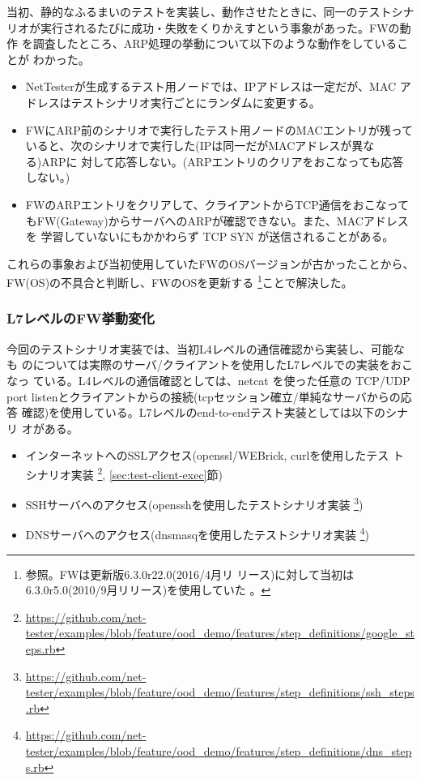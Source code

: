 当初、静的なふるまいのテストを実装し、動作させたときに、同一のテストシナ
リオが実行されるたびに成功・失敗をくりかえすという事象があった。FWの動作
を調査したところ、ARP処理の挙動について以下のような動作をしていることが
わかった。
\begin{itemize}
 \item NetTesterが生成するテスト用ノードでは、IPアドレスは一定だが、MAC
       アドレスはテストシナリオ実行ごとにランダムに変更する。
 \item FWにARP前のシナリオで実行したテスト用ノードのMACエントリが残って
       いると、次のシナリオで実行した(IPは同一だがMACアドレスが異なる)ARPに
       対して応答しない。(ARPエントリのクリアをおこなっても応答しない。)
 \item FWのARPエントリをクリアして、クライアントからTCP通信をおこなって
       もFW(Gateway)からサーバへのARPが確認できない。また、MACアドレスを
       学習していないにもかかわらず TCP SYN が送信されることがある。
\end{itemize}

これらの事象および当初使用していたFWのOSバージョンが古かったことから、
FW(OS)の不具合と判断し、FWのOSを更新する
\footnote{参照。FWは更新版6.3.0r22.0(2016/4月リ
リース)に対して当初は6.3.0r5.0(2010/9月リリース)を使用していた
\cite{screenos-releases}。}ことで解決した。

   \subsubsection{L7レベルのFW挙動変化}
今回のテストシナリオ実装では、当初L4レベルの通信確認から実装し、可能なも
のについては実際のサーバ/クライアントを使用したL7レベルでの実装をおこなっ
ている。L4レベルの通信確認としては、netcat を使った任意の TCP/UDP port
listenとクライアントからの接続(tcpセッション確立/単純なサーバからの応答
確認)を使用している。L7レベルのend-to-endテスト実装としては以下のシナリ
オがある。
\begin{itemize}
 \item インターネットへのSSLアクセス(openssl/WEBrick, curlを使用したテス
       トシナリオ実装
       \footnote{\url{https://github.com/net-tester/examples/blob/feature/ood_demo/features/step_definitions/google_steps.rb}}, \ref{sec:test-client-exec}節)
 \item SSHサーバヘのアクセス(opensshを使用したテストシナリオ実装
       \footnote{\url{https://github.com/net-tester/examples/blob/feature/ood_demo/features/step_definitions/ssh_steps.rb}})
 \item DNSサーバへのアクセス(dnsmasqを使用したテストシナリオ実装
       \footnote{\url{https://github.com/net-tester/examples/blob/feature/ood_demo/features/step_definitions/dns_steps.rb}})
\end{itemize}


